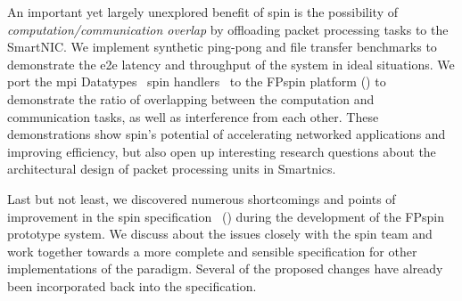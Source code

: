 An important yet largely unexplored benefit of \ac{spin} is the possibility of \emph{computation/communication overlap} by offloading packet processing tasks to the SmartNIC.  We implement synthetic ping-pong and file transfer benchmarks to demonstrate the \ac{e2e} latency and throughput of the system in ideal situations.  We port the \acs{mpi} Datatypes~\cite{ropo_processing_2009} \ac{spin} handlers~\cite{di_girolamo_network-accelerated_2019} to the FP\acs{spin} platform () to demonstrate the ratio of overlapping between the computation and communication tasks, as well as interference from each other.  These demonstrations show \ac{spin}'s potential of accelerating networked applications and improving efficiency, but also open up interesting research questions about the architectural design of packet processing units in Smart\acs{nic}s.

Last but not least, we discovered numerous shortcomings and points of improvement in the \ac{spin} specification~\cite{hoefler_spin_2017} () during the development of the FP\acs{spin} prototype system.  We discuss about the issues closely with the \ac{spin} team and work together towards a more complete and sensible specification for other implementations of the paradigm.  Several of the proposed changes have already been incorporated back into the specification.
